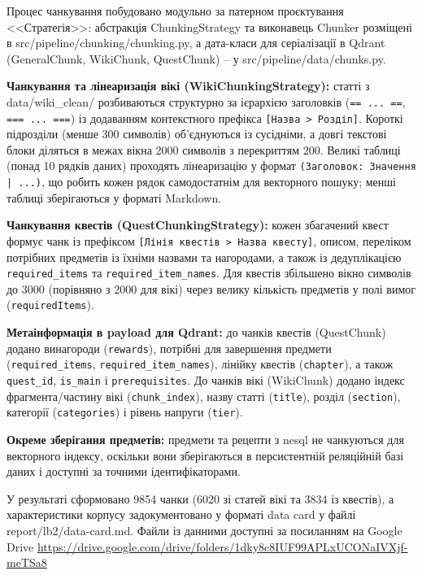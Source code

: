 Процес чанкування побудовано модульно за патерном проєктування <<Стратегія>>: абстракція ChunkingStrategy та виконавець Chunker розміщені в src/pipeline/chunking/chunking.py, а дата-класи для серіалізації в Qdrant (GeneralChunk, WikiChunk, QuestChunk) -- у src/pipeline/data/chunks.py.

\begin{dashlist}[wide]
    \item \textbf{Чанкування та лінеаризація вікі (WikiChunkingStrategy):} статті з data/wiki\_clean/ розбиваються структурно за ієрархією заголовків (\texttt{== ... ==}, \texttt{=== ... ===}) із додаванням контекстного префікса \texttt{[Назва > Розділ]}. Короткі підрозділи (менше 300 символів) об'єднуються із сусідніми, а довгі текстові блоки діляться в межах вікна 2000 символів з перекриттям 200. Великі таблиці (понад 10 рядків даних) проходять лінеаризацію у формат \texttt{(Заголовок: Значення | ...)}, що робить кожен рядок самодостатнім для векторного пошуку; менші таблиці зберігаються у форматі Markdown.
    \item \textbf{Чанкування квестів (QuestChunkingStrategy):} кожен збагачений квест формує чанк із префіксом \texttt{[Лінія квестів > Назва квесту]}, описом, переліком потрібних предметів із їхніми назвами та нагородами, а також із дедуплікацією \texttt{required\_items} та \texttt{required\_item\_names}. Для квестів збільшено вікно символів до 3000 (порівняно з 2000 для вікі) через велику кількість предметів у полі вимог (\texttt{requiredItems}).
    \item \textbf{Метаінформація в payload для Qdrant:} до чанків квестів (QuestChunk) додано винагороди (\texttt{rewards}), потрібні для завершення предмети (\texttt{required\_items}, \texttt{required\_item\_names}), лінійку квестів (\texttt{chapter}), а також \texttt{quest\_id}, \texttt{is\_main} і \texttt{prerequisites}. До чанків вікі (WikiChunk) додано індекс фрагмента/частину вікі (\texttt{chunk\_index}), назву статті (\texttt{title}), розділ (\texttt{section}), категорії (\texttt{categories}) і рівень напруги (\texttt{tier}).
    \item \textbf{Окреме зберігання предметів:} предмети та рецепти з nesql не чанкуються для векторного індексу, оскільки вони зберігаються в персистентній реляційній базі даних і доступні за точними ідентифікаторами.
\end{dashlist}

У результаті сформовано 9854 чанки (6020 зі статей вікі та 3834 із квестів), а характеристики корпусу задокументовано у форматі data card у файлі report/lb2/data-card.md. Файли із данними доступні за посиланням на Google Drive \url{https://drive.google.com/drive/folders/1dky8c8IUF99APLxUCONaIVXjf-meTSa8}